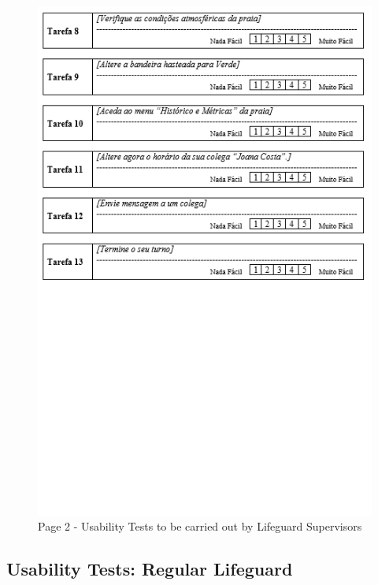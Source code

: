 \begin{figure}[H]
      \centering
      \includegraphics[width=14cm]{figs/UsabilityTest_Supervisor_2.png}
      \caption{Page 2 - Usability Tests to be carried out by Lifeguard Supervisors}
      \label{fig:UsabilityTest_Supervisor1}
\end{figure}

\subsection{Usability Tests: Regular Lifeguard}
\label{section:task_regular_lifeguard}

